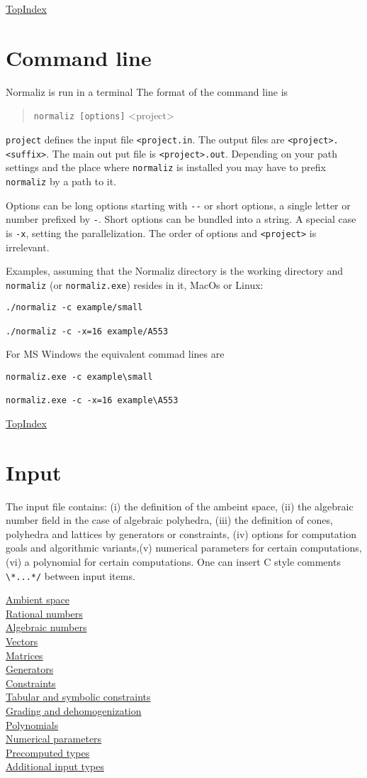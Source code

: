 \documentclass[12pt,a4paper]{scrartcl}
\theoremstyle{definition}
\def\ContLine#1{\hyperref[#1]{\large #1}\\[6pt]}
\def\SectStart#1{\section{#1}\label{#1}\def\SectHead{#1}}
\def\SectStart#1{\section{#1}\label{#1}\def\SectHead{#1}}
\def\TopIndex{\bigskip\bigskip\par \hspace{120pt}\hyperref[Top]{\large Top}\hspace{120pt}\hyperref[Index]{\large Index}\newpage}
\begin{document}
\TopIndex


\SectStart{Command line}

Normaliz is run in a terminal The format of the command line is
\begin{quote}
	\verb|normaliz [options]| <project>
\end{quote}
\verb|project| defines the input file \verb|<project.in|. The output files are \verb|<project>.<suffix>|. The main out put file is \verb|<project>.out|. Depending on your path settings and the place where \verb|normaliz| is installed you may have to prefix \verb|normaliz| by a path to it.

Options can be long options starting with \verb|--| or short options, a single letter or number prefixed by \verb|-|. Short options can be bundled into a string. A special case is \verb|-x|, setting the parallelization. The order of options and \verb|<project>| is irrelevant. 

Examples, assuming that the Normaliz directory is the working directory and \verb|normaliz| (or \verb|normaliz.exe|) resides in it, MacOs or Linux:
\begin{Verbatim}
./normaliz -c example/small

./normaliz -c -x=16 example/A553
\end{Verbatim}
For MS Windows the equivalent commad lines are
\begin{Verbatim}
normaliz.exe -c example\small

normaliz.exe -c -x=16 example\A553
\end{Verbatim}

\TopIndex

\SectStart{Input}

The input file contains: (i) the definition of the ambeint space, (ii) the algebraic number field in the case of algebraic polyhedra, (iii) the definition of cones, polyhedra and lattices by generators or constraints, (iv) options for computation goals and algorithmic variants,(v)  numerical parameters for certain computations, (vi) a polynomial for certain computations. One can insert C style comments \verb|\*...*/| between input items.\bigskip

\ContLine{Ambient space}
\ContLine{Rational numbers}
\ContLine{Algebraic numbers}
\ContLine{Vectors}
\ContLine{Matrices}
\ContLine{Generators}
\ContLine{Constraints}
\ContLine{Tabular and symbolic constraints}
\ContLine{Grading and dehomogenization}
\ContLine{Polynomials}
\ContLine{Numerical parameters}
\ContLine{Precomputed types}
\ContLine{Additional input types}
\medskip
\end{document}
